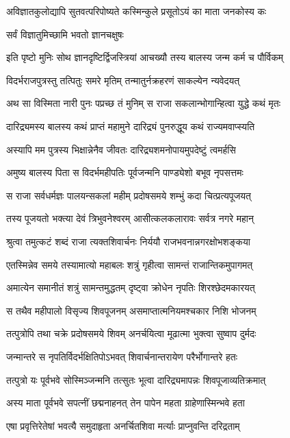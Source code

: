 \begin{center}
\twolineshloka
{अविज्ञातकुलोद्यापि सुतवत्परिपोष्यते}
{कस्मिन्कुले प्रसूतोऽयं का माता जनकोस्य कः} %

\onelineshloka
{सर्वं विज्ञातुमिच्छामि भवतो ज्ञानचक्षुषः} %

\twolineshloka
{इति पृष्टो मुनिः सोथ ज्ञानदृष्टिर्द्विजस्त्रियां}
{आचख्यौ तस्य बालस्य जन्म कर्म च पौर्विकम्} %

\twolineshloka
{विदर्भराजपुत्रस्तु तत्पितुः समरे मृतिम्}
{तन्मातुर्नक्रहरणं साकल्येन न्यवेदयत्} %

\twolineshloka
{अथ सा विस्मिता नारी पुनः पप्रच्छ तं मुनिम्}
{स राजा सकलान्भोगान्हित्वा युद्धे कथं मृतः} %

\twolineshloka
{दारिद्र्यमस्य बालस्य कथं प्राप्तं महामुने}
{दारिद्र्यं पुनरुद्धूय कथं राज्यमवाप्स्यति} %

\twolineshloka
{अस्यापि मम पुत्रस्य भिक्षान्नेनैव जीवतः}
{दारिद्र्यशमनोपायमुपदेष्टुं त्वमर्हसि} %

\twolineshloka
{अमुष्य बालस्य पिता स विदर्भमहीपतिः}
{पूर्वजन्मनि पाण्ड्येशो बभूव नृपसत्तमः} %

\twolineshloka
{स राजा सर्वधर्मज्ञः पालयन्सकलां महीम्}
{प्रदोषसमये शम्भुं कदा चित्प्रत्यपूजयत्} %

\twolineshloka
{तस्य पूजयतो भक्त्या देवं त्रिभुवनेश्वरम्}
{आसीत्कलकलारावः सर्वत्र नगरे महान्} %

\twolineshloka
{श्रुत्वा तमुत्कटं शब्दं राजा त्यक्तशिवार्चनः}
{निर्ययौ राजभवनान्नगरक्षोभशङ्कया} %

\twolineshloka
{एतस्मिन्नेव समये तस्यामात्यो महाबलः}
{शत्रुं गृहीत्वा सामन्तं राजान्तिकमुपागमत्} %

\twolineshloka
{अमात्येन समानीतं शत्रुं सामन्तमुद्धतम्}
{दृष्ट्वा क्रोधेन नृपतिः शिरश्छेदमकारयत्} %

\twolineshloka
{स तथैव महीपालो विसृज्य शिवपूजनम्}
{असमाप्तात्मनियमश्चकार निशि भोजनम्} %

\twolineshloka
{तत्पुत्रोपि तथा चक्रे प्रदोषसमये शिवम्}
{अनर्चयित्वा मूढात्मा भुक्त्वा सुष्वाप दुर्मदः} %

\twolineshloka
{जन्मान्तरे स नृपतिर्विदर्भक्षितिपोऽभवत्}
{शिवार्चनान्तरायेण परैर्भोगान्तरे हतः} %

\twolineshloka
{तत्पुत्रो यः पूर्वभवे सोस्मिञ्जन्मनि तत्सुतः}
{भूत्वा दारिद्र्यमापन्नः शिवपूजाव्यतिक्रमात्} %

\twolineshloka
{अस्य माता पूर्वभवे सपत्नीं छद्मनाहनत्}
{तेन पापेन महता ग्राहेणास्मिन्भवे हता} %

\twolineshloka
{एषा प्रवृत्तिरेतेषां भवत्यै समुदाहृता}
{अनर्चितशिवा मर्त्याः प्राप्नुवन्ति दरिद्रताम्} %


\end{center}
